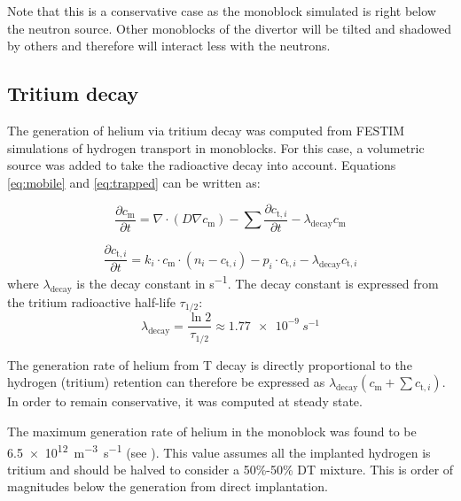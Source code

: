 Note that this is a conservative case as the monoblock simulated is right below the neutron source.
Other monoblocks of the divertor will be tilted and shadowed by others and therefore will interact less with the neutrons.


\subsection{Tritium decay}

The generation of helium via tritium decay was computed from FESTIM simulations of hydrogen transport in monoblocks.
For this case, a volumetric source was added to take the radioactive decay into account.
Equations \ref{eq:mobile} and \ref{eq:trapped} can be written as:

\begin{equation}
    \frac{\partial c_\mathrm{m}}{\partial t}=\nabla \cdot (D \nabla c_\mathrm{m} ) -\sum \frac{\partial c_{\mathrm{t}, i}}{\partial t} - \lambda_\mathrm{decay} c_\mathrm{m}
\end{equation}

\begin{equation}
    \frac{\partial c_{\mathrm{t}, i}}{\partial t}=k_i \cdot c_\mathrm{m} \cdot\left(n_{i}-c_{\mathrm{t}, i}\right)-p_i \cdot c_{\mathrm{t}, i} - \lambda_\mathrm{decay} c_{\mathrm{t}, i}
\end{equation}
where $\lambda_\mathrm{decay}$ is the decay constant in \si{s^{-1}}.
The decay constant is expressed from the tritium radioactive half-life $\tau_{1/2}$:
\begin{equation}
    \lambda_\mathrm{decay} = \frac{\ln 2}{\tau_{1/2}} \approx \SI{1.77e-9}{s^{-1}}
\end{equation}

The generation rate of helium from T decay is directly proportional to the hydrogen (tritium) retention can therefore be expressed as $\lambda_\mathrm{decay} (c_\mathrm{m} + \sum c_{\mathrm{t}, i})$.
In order to remain conservative, it was computed at steady state.

The maximum generation rate of helium in the monoblock was found to be \SI{6.5e12}{m^{-3}.s^{-1}} (see ).
This value assumes all the implanted hydrogen is tritium and should be halved to consider a 50\%-50\% DT mixture.
This is order of magnitudes below the generation from direct implantation.

